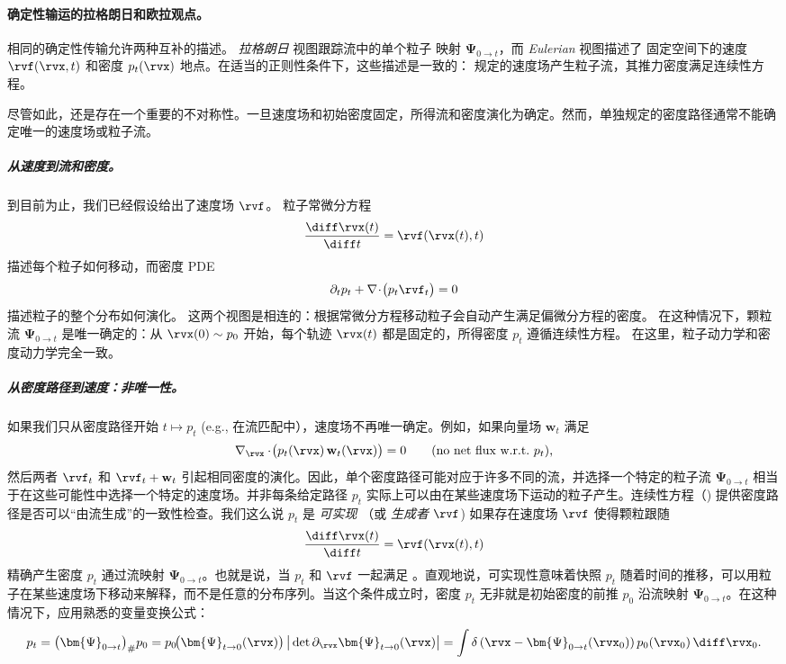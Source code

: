 \paragraph{确定性输运的拉格朗日和欧拉观点。}
相同的确定性传输允许两种互补的描述。
\emph{拉格朗日} 视图跟踪流中的单个粒子
映射 $\bm{\Psi}_{0\to t}$，而 \emph{Eulerian} 视图描述了
固定空间下的速度 $\rvf(\rvx,t)$ 和密度 $p_t(\rvx)$
地点。在适当的正则性条件下，这些描述是一致的：
规定的速度场产生粒子流，其推力密度满足连续性方程。

尽管如此，还是存在一个重要的不对称性。一旦速度场和初始密度固定，所得流和密度演化为确定。然而，单独规定的密度路径通常不能确定唯一的速度场或粒子流。


\subparagraph{从速度到流和密度。}
到目前为止，我们已经假设给出了速度场 $\rvf$。
粒子常微分方程
\[
\frac{\diff \rvx(t)}{\diff t} = \rvf(\rvx(t), t)
\]
描述每个粒子如何移动，而密度 PDE
\[
\partial_t p_t + \nabla \!\cdot \!\big(p_t \rvf_t\big) = 0
\]
描述粒子的整个分布如何演化。
这两个视图是相连的：根据常微分方程移动粒子会自动产生满足偏微分方程的密度。
在这种情况下，颗粒流 $\bm{\Psi}_{0\to t}$ 是唯一确定的：从 $\rvx(0)\sim p_0$ 开始，每个轨迹 $\rvx(t)$ 都是固定的，所得密度 $p_t$ 遵循连续性方程。
在这里，粒子动力学和密度动力学完全一致。

\subparagraph{从密度路径到速度：非唯一性。}
如果我们只从密度路径开始 $t \mapsto p_t$ (e.g.,  在流匹配中），速度场不再唯一确定。例如，如果向量场 $\mathbf w_t$ 满足
\[
\nabla_{\rvx}\cdot\!\big(p_t(\rvx)\,\mathbf w_t(\rvx)\big)=0
\qquad\text{(no net flux w.r.t.\ $p_t$),}
\]
然后两者 $\rvf_t$ 和 $\rvf_t+\mathbf w_t$ 引起相同密度的演化。因此，单个密度路径可能对应于许多不同的流，并选择一个特定的粒子流 $\bm{\Psi}_{0\to t}$ 相当于在这些可能性中选择一个特定的速度场。并非每条给定路径 $p_t$ 实际上可以由在某些速度场下运动的粒子产生。连续性方程（) 提供密度路径是否可以“由流生成”的一致性检查。我们这么说 $p_t$ 是 \emph{可实现} （或 \emph{生成者} $\rvf$) 如果存在速度场 $\rvf$ 使得颗粒跟随
\[
\dfrac{\diff \rvx(t)}{\diff t} = \rvf(\rvx(t), t)
\]
精确产生密度 $p_t$ 通过流映射 $\bm{\Psi}_{0\to t}$。也就是说，当 $p_t$ 和 $\rvf$ 一起满足 。直观地说，可实现性意味着快照 $p_t$ 随着时间的推移，可以用粒子在某些速度场下移动来解释，而不是任意的分布序列。当这个条件成立时，密度 $p_t$ 无非就是初始密度的前推 $p_0$ 沿流映射 $\bm{\Psi}_{0\to t}$。在这种情况下，应用熟悉的变量变换公式：
\begin{align*}
    p_t = \big(\bm{\Psi}_{0\to t}\big)_{\#} p_0
= p_0\!\big(\bm{\Psi}_{t\to 0}(\rvx)\big)\,
   \big|\det \partial_\rvx\bm{\Psi}_{t\to 0}(\rvx)\big|
= \int \delta \left(\rvx - \bm{\Psi}_{0\to t}(\rvx_0)\right)
   p_0(\rvx_0)\,\diff\rvx_0.
\end{align*}



